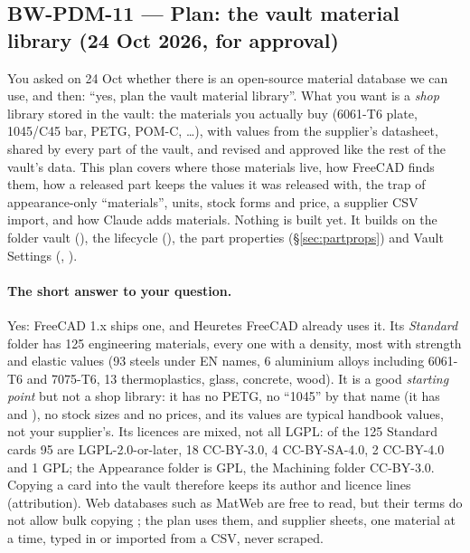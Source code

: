 \subsection{BW-PDM-11 --- Plan: the vault material library (24 Oct 2026, for approval)}\label{sec:pdm11-plan}

You asked on 24 Oct whether there is an open-source material database we can use, and then: ``yes, plan the vault
material library''. What you want is a \emph{shop} library stored in the vault: the materials you actually buy
(6061-T6 plate, 1045/C45 bar, PETG, POM-C, \ldots), with values from the supplier's datasheet, shared by every part of
the vault, and revised and approved like the rest of the vault's data. This plan covers where those materials live,
how FreeCAD finds them, how a released part keeps the values it was released with, the trap of appearance-only
``materials'', units, stock forms and price, a supplier CSV import, and how Claude adds materials. Nothing is built yet.
It builds on the folder vault (), the lifecycle (), the part properties
(\S\ref{sec:partprops}) and Vault Settings (, ).

\paragraph{The short answer to your question.} Yes: FreeCAD 1.x ships one, and Heuretes FreeCAD already uses it. Its
\emph{Standard} folder has 125 engineering materials, every one with a density, most with strength and elastic values
(93 steels under EN names, 6 aluminium alloys including 6061-T6 and 7075-T6, 13 thermoplastics, glass, concrete,
wood). It is a good \emph{starting point} but not a shop library: it has no PETG, no ``1045'' by that name (it has
 and ), no stock sizes and no prices, and its values are typical handbook values, not your
supplier's. Its licences are mixed, not all LGPL: of the 125 Standard cards 95 are LGPL-2.0-or-later, 18 CC-BY-3.0,
4 CC-BY-SA-4.0, 2 CC-BY-4.0 and 1 GPL; the Appearance folder is GPL, the Machining folder CC-BY-3.0. Copying a card
into the vault therefore keeps its author and licence lines (attribution). Web databases such as MatWeb are free to
read, but their terms do not allow bulk copying \verify; the plan uses them, and supplier sheets, one material at a
time, typed in or imported from a CSV, never scraped.

